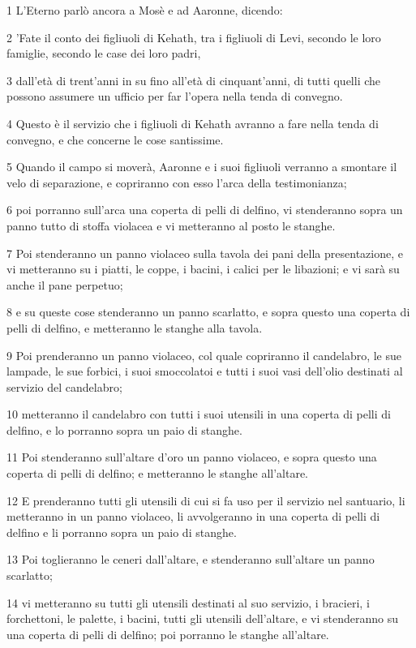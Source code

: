 \par 1 L'Eterno parlò ancora a Mosè e ad Aaronne, dicendo:
\par 2 'Fate il conto dei figliuoli di Kehath, tra i figliuoli di Levi, secondo le loro famiglie, secondo le case dei loro padri,
\par 3 dall'età di trent'anni in su fino all'età di cinquant'anni, di tutti quelli che possono assumere un ufficio per far l'opera nella tenda di convegno.
\par 4 Questo è il servizio che i figliuoli di Kehath avranno a fare nella tenda di convegno, e che concerne le cose santissime.
\par 5 Quando il campo si moverà, Aaronne e i suoi figliuoli verranno a smontare il velo di separazione, e copriranno con esso l'arca della testimonianza;
\par 6 poi porranno sull'arca una coperta di pelli di delfino, vi stenderanno sopra un panno tutto di stoffa violacea e vi metteranno al posto le stanghe.
\par 7 Poi stenderanno un panno violaceo sulla tavola dei pani della presentazione, e vi metteranno su i piatti, le coppe, i bacini, i calici per le libazioni; e vi sarà su anche il pane perpetuo;
\par 8 e su queste cose stenderanno un panno scarlatto, e sopra questo una coperta di pelli di delfino, e metteranno le stanghe alla tavola.
\par 9 Poi prenderanno un panno violaceo, col quale copriranno il candelabro, le sue lampade, le sue forbici, i suoi smoccolatoi e tutti i suoi vasi dell'olio destinati al servizio del candelabro;
\par 10 metteranno il candelabro con tutti i suoi utensili in una coperta di pelli di delfino, e lo porranno sopra un paio di stanghe.
\par 11 Poi stenderanno sull'altare d'oro un panno violaceo, e sopra questo una coperta di pelli di delfino; e metteranno le stanghe all'altare.
\par 12 E prenderanno tutti gli utensili di cui si fa uso per il servizio nel santuario, li metteranno in un panno violaceo, li avvolgeranno in una coperta di pelli di delfino e li porranno sopra un paio di stanghe.
\par 13 Poi toglieranno le ceneri dall'altare, e stenderanno sull'altare un panno scarlatto;
\par 14 vi metteranno su tutti gli utensili destinati al suo servizio, i bracieri, i forchettoni, le palette, i bacini, tutti gli utensili dell'altare, e vi stenderanno su una coperta di pelli di delfino; poi porranno le stanghe all'altare.
